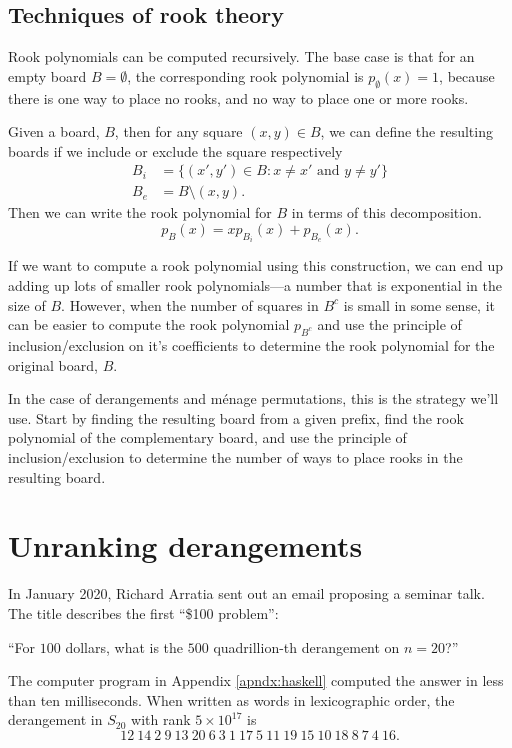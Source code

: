 \subsection{Techniques of rook theory}
Rook polynomials can be computed recursively. The base case is that
for an empty board $B = \emptyset$, the corresponding rook polynomial is
$p_\emptyset(x) = 1$, because there is one way to place no rooks, and no way
to place one or more rooks.
\begin{lemma}
  Given a board, $B$, then for any square $(x,y) \in B$, we can define
  the resulting boards if we include or exclude the square respectively
  \begin{align}
    B_i &= \{(x',y') \in B : x \neq x' \text{ and } y \neq y'\} \\
    B_e &= B \setminus {(x,y)}.
  \end{align}
  Then we can write the rook polynomial for $B$ in terms of this decomposition.
  \[
    p_B(x) = xp_{B_i}(x) + p_{B_e}(x).
  \]
  \label{lemma:rookPolynomialRecursion}
\end{lemma}

If we want to compute a rook polynomial using this construction, we can end
up adding up lots of smaller rook polynomials---a number that is exponential in
the size of $B$.
However, when the number of squares in $B^c$ is small in some sense, it can be
easier to compute the rook polynomial $p_{B^c}$ and use the principle of
inclusion/exclusion on it's coefficients to determine the rook polynomial for
the original board, $B$.

In the case of derangements and m\'enage permutations, this is the strategy
we'll use.
Start by finding the resulting board from a given prefix,
find the rook polynomial of the complementary board, and
use the principle of inclusion/exclusion to determine the number of ways to
place rooks in the resulting board.

\section{Unranking derangements}

In January 2020, Richard Arratia sent out an email proposing a seminar talk.
The title describes the first ``\$100 problem'':
\begin{problem}
``For $100$ dollars, what is the $500$ quadrillion-th derangement on $n=20$?''
\end{problem}

\begin{answer}
The computer program in Appendix \ref{apndx:haskell} computed the answer in less than ten
milliseconds. When written as words in lexicographic order, the
derangement in $S_{20}$ with rank $5 \times 10^{17}$ is \[
  12\ 14\ 2\ 9\ 13\ 20\ 6\ 3\ 1\ 17\ 5\ 11\ 19\ 15\ 10\ 18\ 8\ 7\ 4\ 16.
\]
\end{answer}

